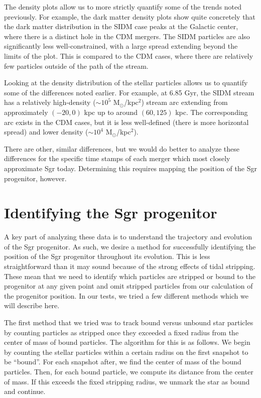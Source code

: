 The density plots allow us to more strictly quantify some of the trends noted
previously. For example, the dark matter density plots show quite concretely
that the dark matter distribution in the SIDM case peaks at the Galactic center,
where there is a distinct hole in the CDM mergers. The SIDM particles are also
significantly less well-constrained, with a large spread extending beyond the
limits of the plot. This is compared to the CDM cases, where there are
relatively few particles outside of the path of the stream.

Looking at the density distribution of the stellar particles allows us to
quantify some of the differences noted earlier.  For example, at 6.85 Gyr, the
SIDM stream has a relatively high-density ($\sim 10^5$ M$_\odot$/kpc$^2$)
stream arc extending from approximately $(-20,0)$ kpc up to around $(60,125)$
kpc.  The corresponding arc exists in the CDM cases, but it is less
well-defined (there is more horizontal spread) and lower density ($\sim 10^4$
M$_\odot$/kpc$^2$).

There are other, similar differences, but we would do better to analyze these
differences for the specific time stamps of each merger which most closely
approximate Sgr today. Determining this requires mapping the position of the Sgr
progenitor, however.


\hypertarget{identifying-the-sgr-progenitor}{%
\section{Identifying the Sgr
progenitor}\label{identifying-the-sgr-progenitor}}

A key part of analyzing these data is to understand the trajectory and
evolution of the Sgr progenitor.  As such, we desire a method for successfully
identifying the position of the Sgr progenitor throughout its evolution.  This
is less straightforward than it may sound because of the strong effects of
tidal stripping.  These mean that we need to identify which particles are
stripped or bound to the progenitor at any given point and omit stripped
particles from our calculation of the progenitor position.  In our tests, we
tried a few different methods which we will describe here.

The first method that we tried was to track bound versus unbound star
particles by counting particles as stripped once they exceeded a fixed radius
from the center of mass of bound particles.  The algorithm for this is as
follows.  We begin by counting the stellar particles within a certain radius
on the first snapshot to be ``bound''.  For each snapshot after, we find the
center of mass of the bound particles.  Then, for each bound particle, we
compute its distance from the center of mass.  If this exceeds the fixed
stripping radius, we unmark the star as bound and continue.

